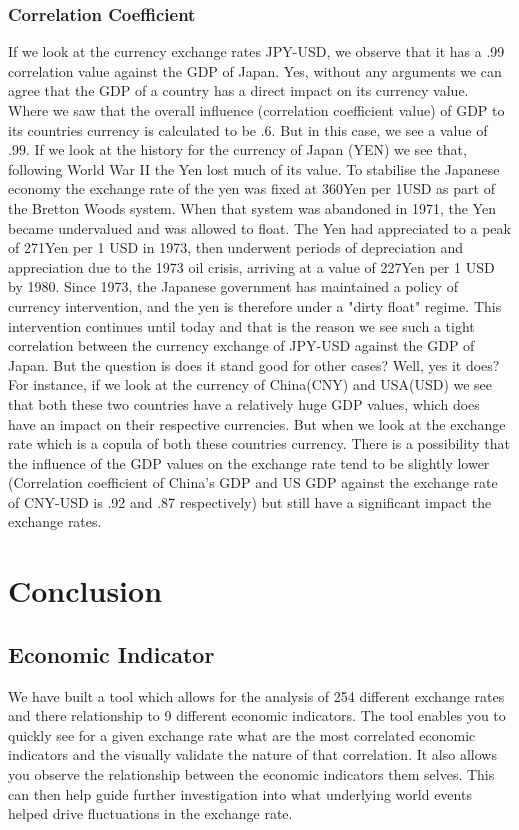 \subsubsection{Correlation Coefficient}
If we look at the currency exchange rates JPY-USD, we observe that it has a .99 correlation value against the GDP of Japan. Yes, without any arguments we can agree that the GDP of a country has a direct impact on its currency value. Where we saw that the overall influence (correlation coefficient value) of GDP to its countries currency is calculated to be .6. But in this case, we see a value of .99.
\newline
If we look at the history for the currency of Japan (YEN) we see that, following World War II the Yen lost much of its value. To stabilise the Japanese economy the exchange rate of the yen was fixed at 360Yen per 1USD as part of the Bretton Woods system. When that system was abandoned in 1971, the Yen became undervalued and was allowed to float. The Yen had appreciated to a peak of 271Yen per 1 USD in 1973, then underwent periods of depreciation and appreciation due to the 1973 oil crisis, arriving at a value of 227Yen per 1 USD by 1980. Since 1973, the Japanese government has maintained a policy of currency intervention, and the yen is therefore under a "dirty float" regime. This intervention continues until today and that is the reason we see such a tight correlation between the currency exchange of JPY-USD against the GDP of Japan.\newline
But the question is does it stand good for other cases? Well, yes it does? For instance, if we look at the currency of China(CNY) and USA(USD) we see that both these two countries have a relatively huge GDP values, which does have an impact on their respective currencies. But when we look at the exchange rate which is a copula of both these countries currency. There is a possibility that the influence of the GDP values on the exchange rate tend to be slightly lower (Correlation coefficient of China's GDP and US GDP against the exchange rate of CNY-USD is .92 and .87 respectively) but still have a significant impact the exchange rates. 

\section{Conclusion}
\subsection{Economic Indicator}
We have built a tool which allows for the analysis of 254 different exchange rates and there relationship to 9 different economic indicators.  The tool enables you to quickly see for a given exchange rate what are the most correlated economic indicators and the visually validate the nature of that correlation.  It also allows you observe the relationship between the economic indicators them selves.  This can then help guide further investigation into what underlying world events helped drive fluctuations in the exchange rate.


